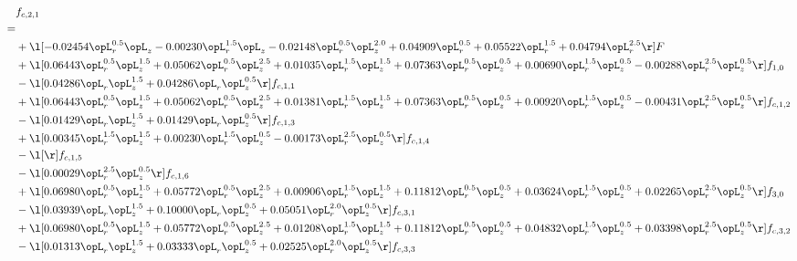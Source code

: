 \begin{alignat}{2} 
\label{eq:f_21_1} 
& f_{c,2,1} \nonumber \\ 
 = \\ 
& + \l[  -0.02454 \opL_r^{0.5} \opL_z   -0.00230 \opL_r^{1.5} \opL_z   -0.02148 \opL_r^{0.5} \opL_z^{2.0} +  0.04909 \opL_r^{0.5} +  0.05522 \opL_r^{1.5} +  0.04794 \opL_r^{2.5}  \r] F \nonumber \\ 
& + \l[  0.06443 \opL_r^{0.5} \opL_z^{1.5} +  0.05062 \opL_r^{0.5} \opL_z^{2.5} +  0.01035 \opL_r^{1.5} \opL_z^{1.5} +  0.07363 \opL_r^{0.5} \opL_z^{0.5} +  0.00690 \opL_r^{1.5} \opL_z^{0.5}   -0.00288 \opL_r^{2.5} \opL_z^{0.5}  \r] f_{1,0} \nonumber \\ 
& - \l[  0.04286 \opL_r \opL_z^{1.5} +  0.04286 \opL_r \opL_z^{0.5}  \r] f_{c,1,1} \nonumber \\ 
& + \l[  0.06443 \opL_r^{0.5} \opL_z^{1.5} +  0.05062 \opL_r^{0.5} \opL_z^{2.5} +  0.01381 \opL_r^{1.5} \opL_z^{1.5} +  0.07363 \opL_r^{0.5} \opL_z^{0.5} +  0.00920 \opL_r^{1.5} \opL_z^{0.5}   -0.00431 \opL_r^{2.5} \opL_z^{0.5}  \r] f_{c,1,2} \nonumber \\ 
& - \l[  0.01429 \opL_r \opL_z^{1.5} +  0.01429 \opL_r \opL_z^{0.5}  \r] f_{c,1,3} \nonumber \\ 
& + \l[  0.00345 \opL_r^{1.5} \opL_z^{1.5} +  0.00230 \opL_r^{1.5} \opL_z^{0.5}   -0.00173 \opL_r^{2.5} \opL_z^{0.5}  \r] f_{c,1,4} \nonumber \\ 
& - \l[  \r] f_{c,1,5} \nonumber \\ 
& - \l[  0.00029 \opL_r^{2.5} \opL_z^{0.5}  \r] f_{c,1,6} \nonumber \\ 
& + \l[  0.06980 \opL_r^{0.5} \opL_z^{1.5} +  0.05772 \opL_r^{0.5} \opL_z^{2.5} +  0.00906 \opL_r^{1.5} \opL_z^{1.5} +  0.11812 \opL_r^{0.5} \opL_z^{0.5} +  0.03624 \opL_r^{1.5} \opL_z^{0.5} +  0.02265 \opL_r^{2.5} \opL_z^{0.5}  \r] f_{3,0} \nonumber \\ 
& - \l[  0.03939 \opL_r \opL_z^{1.5} +  0.10000 \opL_r \opL_z^{0.5} +  0.05051 \opL_r^{2.0} \opL_z^{0.5}  \r] f_{c,3,1} \nonumber \\ 
& + \l[  0.06980 \opL_r^{0.5} \opL_z^{1.5} +  0.05772 \opL_r^{0.5} \opL_z^{2.5} +  0.01208 \opL_r^{1.5} \opL_z^{1.5} +  0.11812 \opL_r^{0.5} \opL_z^{0.5} +  0.04832 \opL_r^{1.5} \opL_z^{0.5} +  0.03398 \opL_r^{2.5} \opL_z^{0.5}  \r] f_{c,3,2} \nonumber \\ 
& - \l[  0.01313 \opL_r \opL_z^{1.5} +  0.03333 \opL_r \opL_z^{0.5} +  0.02525 \opL_r^{2.0} \opL_z^{0.5}  \r] f_{c,3,3} \nonumber \\ 

\end{alignat}
